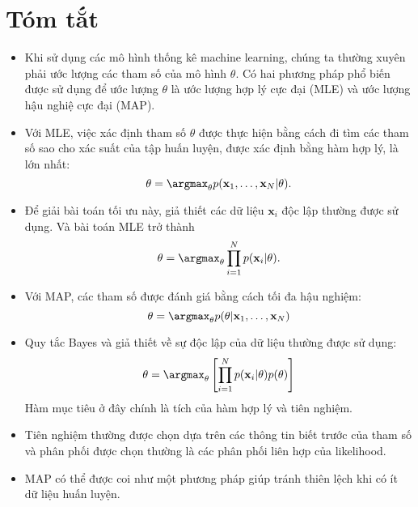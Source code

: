  
 
\section{Tóm tắt}
\begin{itemize}
    \item Khi sử dụng các mô hình thống kê machine learning, chúng ta thường
    xuyên phải ước lượng các tham số của mô hình $\theta$. Có hai phương pháp phổ biến được sử dụng để
    ước lượng $\theta$ là ước lượng hợp lý cực đại (MLE) và ước lượng hậu nghiệ cực đại (MAP).
     
    \item Với MLE, việc xác định tham số $\theta$ được thực hiện bằng cách đi
    tìm các tham số sao cho xác suất của tập huấn luyện, được xác định bằng
    hàm {hợp lý}, là lớn nhất: 
    \begin{equation} 
      \theta = \argmax_{\theta} p(\mathbf{x}_1, \dots, \mathbf{x}_N |\theta). 
    \end{equation} 
     
    \item Để giải bài toán tối ưu này, giả thiết các dữ liệu $\mathbf{x}_i$ độc lập thường được sử dụng. Và bài toán MLE trở thành
    \begin{equation} 
      \theta = \argmax_{\theta} \prod_{i=1}^N p(\mathbf{x}_i | \theta).
    \end{equation} 
     
    \item Với MAP, các tham số được đánh giá bằng cách tối đa {hậu nghiệm}: 
    \begin{equation} 
        \theta = \argmax_{\theta} p(\theta | \mathbf{x}_1, \dots, \mathbf{x}_N) 
    \end{equation} 
    \item Quy tắc Bayes và giả thiết về sự độc lập của dữ
    liệu thường được sử dụng: 
    \begin{equation} \theta = \argmax_{\theta}
        \left[\prod_{i=1}^N p(\mathbf{x}_i | \theta) p(\theta) \right]
    \end{equation} 
    Hàm mục tiêu ở đây chính là tích của {hàm hợp lý} và tiên nghiệm.

     
    \item Tiên nghiệm thường được chọn dựa trên các thông tin biết trước của
    tham số và phân phối được chọn thường là các phân phối liên hợp của likelihood.
     
    \item MAP có thể được coi như một phương pháp giúp tránh thiên lệch khi có
    ít dữ liệu huấn luyện.
     
\end{itemize}
 
